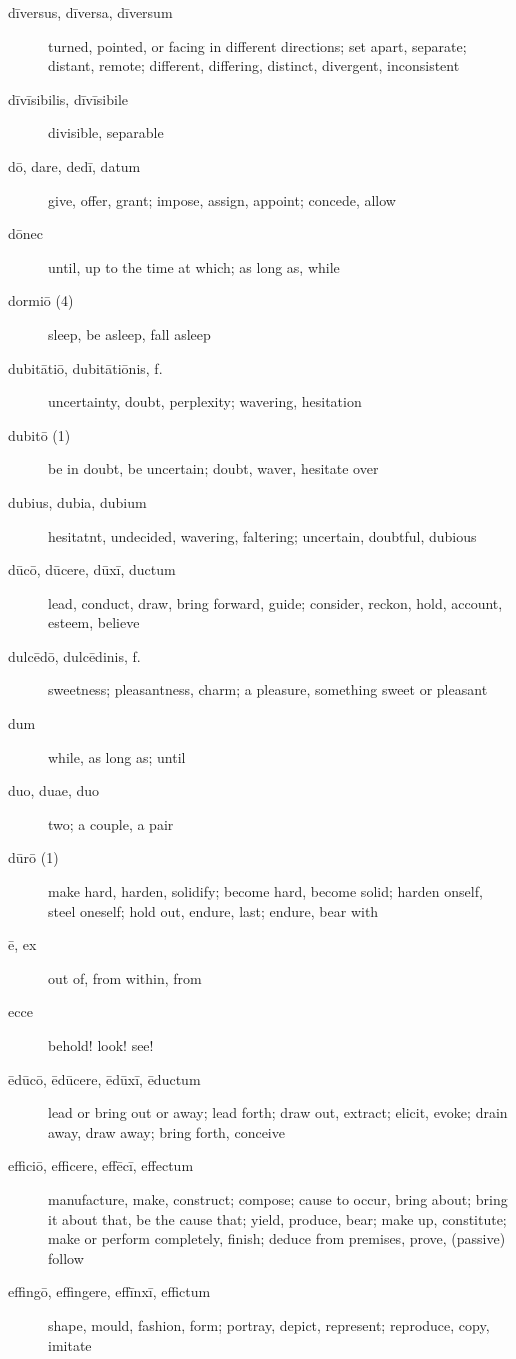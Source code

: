 \begin{description}
    \item[dīversus, dīversa, dīversum] turned, pointed, or facing in different directions; set apart, separate; distant, remote; different, differing, distinct, divergent, inconsistent
    \item[dīvīsibilis, dīvīsibile] divisible, separable
    \item[dō, dare, dedī, datum] \marginnote{*}give, offer, grant; impose, assign, appoint; concede, allow
    \item[dōnec] \marginnote{*}until, up to the time at which; as long as, while
    \item[dormiō (4)] \marginnote{*}sleep, be asleep, fall asleep
    \item[dubitātiō, dubitātiōnis, f.] uncertainty, doubt, perplexity; wavering, hesitation
    \item[dubitō (1)] \marginnote{*}be in doubt, be uncertain; doubt, waver, hesitate over
    \item[dubius, dubia, dubium] \marginnote{*}hesitatnt, undecided, wavering, faltering; uncertain, doubtful, dubious
    \item[dūcō, dūcere, dūxī, ductum] \marginnote{*}lead, conduct, draw, bring forward, guide; consider, reckon, hold, account, esteem, believe
    \item[dulcēdō, dulcēdinis, f.] sweetness; pleasantness, charm; a pleasure, something sweet or pleasant
    \item[dum] \marginnote{*}while, as long as; until
    \item[duo, duae, duo] \marginnote{*}two; a couple, a pair
    \item[dūrō (1)] make hard, harden, solidify; become hard, become solid; harden onself, steel oneself; hold out, endure, last; endure, bear with
    \item[ē, ex] \marginnote{*}out of, from within, from
    \item[ecce] \marginnote{*}behold! look! see!
    \item[ēdūcō, ēdūcere, ēdūxī, ēductum] \marginnote{*}lead or bring out or away; lead forth; draw out, extract; elicit, evoke; drain away, draw away; bring forth, conceive
    \item[efficiō, efficere, effēcī, effectum] \marginnote{*}manufacture, make, construct; compose; cause to occur, bring about; bring it about that, be the cause that; yield, produce, bear; make up, constitute; make or perform completely, finish; deduce from premises, prove, (passive) follow
    \item[effingō, effingere, effīnxī, effictum] shape, mould, fashion, form; portray, depict, represent; reproduce, copy, imitate

\end{description}
